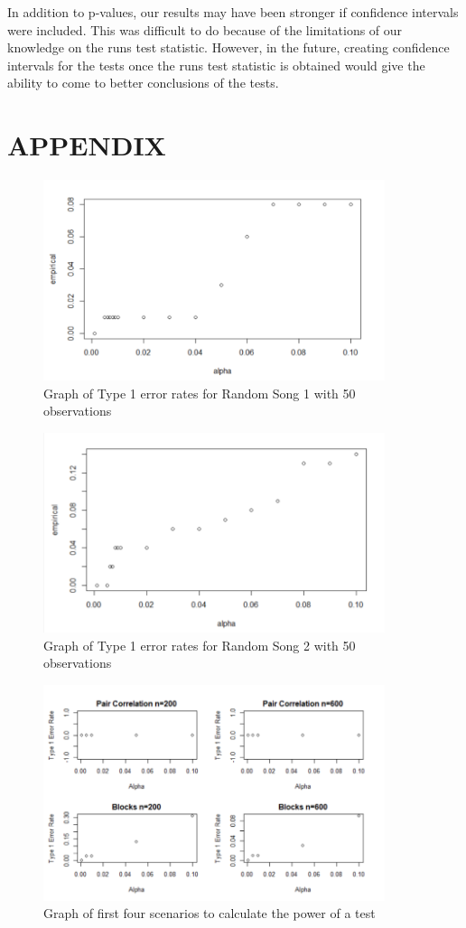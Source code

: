\documentclass[12pt, letterpaper]{article}
\begin{document}
In addition to p-values, our results may have been stronger if confidence intervals were included. This was difficult to do because of the limitations of our knowledge on the runs test statistic. However, in the future, creating confidence intervals for the tests once the runs test statistic is obtained would give the ability to come to better conclusions of the tests.

\section{APPENDIX}
\begin{figure}[!hb]
\centering
\includegraphics[width=10cm]{Type1_Song1.png}
\caption{Graph of Type 1 error rates for Random Song 1 with 50 observations}
\label{fig: Type 1 Error, Song 1, n=50}
\end{figure}

\begin{figure}[!hb]
\centering
\includegraphics[width=10cm]{Type1_Song2.png}
\caption{Graph of Type 1 error rates for Random Song 2 with 50 observations}
\label{fig: Type 1 Error, Song 2, n=50}
\end{figure}

\begin{figure}[!hb]
\centering
\includegraphics[width=10cm]{PowerGraphs1.png}
\caption{Graph of first four scenarios to calculate the power of a test}
\label{fig: Power Graphs 1}
\end{figure}
\end{document}
